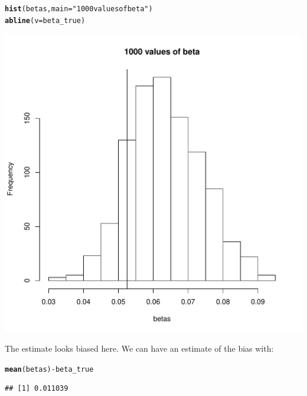 \documentclass[11pt]{article}\usepackage[]{graphicx}\usepackage[]{color}
\makeatletter
\def\maxwidth{ %
  \ifdim\Gin@nat@width>\linewidth
    \linewidth
  \else
    \Gin@nat@width
  \fi
}
\newcommand{\hlstr}[1]{\textcolor[rgb]{0.192,0.494,0.8}{#1}}%
\newcommand{\hlopt}[1]{\textcolor[rgb]{0,0,0}{#1}}%
\newcommand{\hlstd}[1]{\textcolor[rgb]{0.345,0.345,0.345}{#1}}%
\newcommand{\hlkwc}[1]{\textcolor[rgb]{0.333,0.667,0.333}{#1}}%
\newcommand{\hlkwd}[1]{\textcolor[rgb]{0.737,0.353,0.396}{\textbf{#1}}}%
\newenvironment{kframe}{%
 \def\at@end@of@kframe{}%
 \ifinner\ifhmode%
  \def\at@end@of@kframe{\end{minipage}}%
  \begin{minipage}{\columnwidth}%
 \fi\fi%
 \def\FrameCommand##1{\hskip\@totalleftmargin \hskip-\fboxsep
 \colorbox{shadecolor}{##1}\hskip-\fboxsep
     \hskip-\linewidth \hskip-\@totalleftmargin \hskip\columnwidth}%
 \MakeFramed {\advance\hsize-\width
   \@totalleftmargin\z@ \linewidth\hsize
   \@setminipage}}%
 {\par\unskip\endMakeFramed%
 \at@end@of@kframe}
\newenvironment{knitrout}{}{} %
\makeatother
\begin{document}
\section{} 
\begin{knitrout}
\color{fgcolor}\begin{kframe}
\begin{alltt}
\hlkwd{hist}\hlstd{(betas,}\hlkwc{main} \hlstd{=} \hlstr{"1000 values of beta"}\hlstd{)}
\hlkwd{abline}\hlstd{(}\hlkwc{v} \hlstd{= beta_true)}
\end{alltt}
\end{kframe}
\includegraphics[width=\maxwidth]{figure/unnamed-chunk-11-1} 

\end{knitrout}
The estimate looks biased here. We can have an estimate of the bias with:
\begin{knitrout}
\color{fgcolor}\begin{kframe}
\begin{alltt}
\hlkwd{mean}\hlstd{(betas)} \hlopt{-} \hlstd{beta_true}
\end{alltt}
\begin{verbatim}
## [1] 0.011039
\end{verbatim}
\end{kframe}
\end{knitrout}
\end{document}
